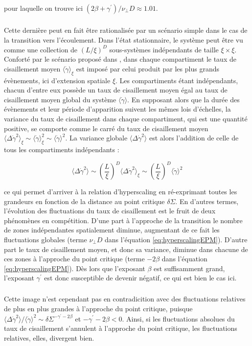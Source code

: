 \noindent pour laquelle on trouve ici $(2\beta + \gamma^\prime) / \nu_\perp D\approx 1.01$.  

\subparagraph{}Cette dernière peut en fait être rationalisée par un scénario simple dans le cas de la transition vers l'écoulement. Dans l'état stationnaire, le système peut être vu comme une collection de $(L/\xi)^D$ sous-systèmes indépendants de taille $\xi \times \xi$. Conforté par le scénario proposé dans \cite{lin_scaling_2014}, dans chaque compartiment le taux de cisaillement moyen $\langle\dot{\gamma}\rangle_\xi$ est imposé par celui produit par les plus grands évènements, ici d'extension spatiale $\xi$. Les compartiments étant indépendants, chacun d'entre eux possède un taux de cisaillement moyen égal au taux de cisaillement moyen global du système $\langle \dot{\gamma} \rangle$. En supposant alors que la durée des évènements et leur période d'apparition suivent les mêmes lois d'échelles, la variance du taux de cisaillement dans chaque compartiment, qui est une quantité positive, se comporte comme le carré du taux de cisaillement moyen $\langle \Delta\dot{\gamma}^2 \rangle_\xi \sim \langle\dot{\gamma}\rangle_\xi^2 \sim \langle\dot{\gamma}\rangle^2$. La variance globale $\langle \Delta\dot{\gamma}^2 \rangle$ est alors l'addition de celle de tous les compartiments indépendants :

\begin{equation}
	\langle \Delta\dot{\gamma}^2 \rangle \sim \left(\frac{L}{\xi}\right)^D\langle \Delta\dot{\gamma}^2 \rangle_\xi \sim \left(\frac{L}{\xi}\right)^D\langle \dot{\gamma} \rangle^2
\end{equation}

\noindent ce qui permet d'arriver à la relation d'hyperscaling en ré-exprimant toutes les grandeurs en fonction de la distance au point critique $\delta\Sigma$. En d'autres termes, l'évolution des fluctuations du taux de cisaillement est le fruit de deux phénomènes en compétition. D'une part à l'approche de la transition le nombre de zones indépendantes spatialement diminue, augmentant de ce fait les fluctuations globales (terme $\nu_\perp D$ dans l'équation \autoref{eq:hyperscalingEPM}). D'autre part le taux de cisaillement moyen, et donc sa variance, diminue dans chacune de ces zones à l'approche du point critique (terme $-2\beta$ dans l'équation \autoref{eq:hyperscalingEPM}). Dès lors que l'exposant $\beta$ est suffisamment grand, l'exposant $\gamma^\prime$ est donc susceptible de devenir négatif, ce qui est bien le cas ici.

\subparagraph{}Cette image n'est cependant pas en contradicition avec des fluctuations relatives de plus en plus grandes à l'approche du point critique, puisque $\langle \Delta\dot{\gamma}^2 \rangle/\langle \dot{\gamma}\rangle^2 \sim \delta\Sigma^{-\gamma^\prime - 2\beta}$ et $-\gamma^\prime - 2\beta < 0$. Ainsi, si les fluctuations absolues du taux de cisaillement s'annulent à l'approche du point critique, les fluctuations relatives, elles, divergent bien.

